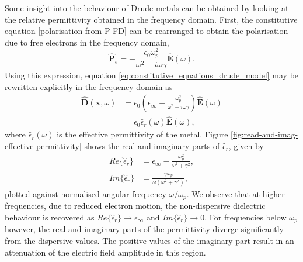 Some insight into the behaviour of Drude metals can be obtained by looking at the relative permittivity obtained in the frequency domain. First, the constitutive equation \ref{polarisation-from-P-FD} can be rearranged to obtain the polarisation due to free electrons in the frequency domain,
\begin{equation}
\hat{\mathbf{P}}_e = - \frac{\epsilon_0 \omega_p^2}{\omega^2 - i \omega \gamma } \hat{\mathbf{E}}(\omega) .
  \label{eq:polarization-field-freq-domain}
\end{equation}
Using this expression, equation \ref{eq:constitutive_equations_drude_model} may be rewritten explicitly in the frequency domain as
\begin{equation}
    \begin{split}
    \hat{\mathbf{D}}(\mathbf{x},\omega) &= \epsilon_0 \left( \epsilon_{\infty} - \frac{\omega_p^2 }{\omega^2 - i \omega \gamma } \right) \hat{\mathbf{E}}(\omega) \\
                                        &= \epsilon_0 \hat{\epsilon}_r (\omega) \hat{\mathbf{E}}(\omega) ,
    \end{split}
\end{equation}
where $\hat{\epsilon}_r(\omega)$ is the effective permittivity of the metal. Figure \ref{fig:read-and-imag-effective-permittivity} shows the real and imaginary parts of $\hat{\epsilon}_r$, given by
\begin{subequations}
\begin{align}
    Re\{ \hat{\epsilon}_r \} &= \epsilon_{\infty} - \frac{\omega_p^2}{\omega^2 + \gamma^2}, \\
    Im\{ \hat{\epsilon}_r \} &= \frac{\gamma \omega_p}{\omega ( \omega^2 + \gamma^2) } ,
\end{align}
\end{subequations}
plotted against normalised angular frequency $\omega / \omega_p$. We observe that at higher frequencies, due to reduced electron motion, the non-dispersive dielectric behaviour is recovered as $Re\{\hat{\epsilon}_r\} \to \epsilon_{\infty}$ and $Im\{\hat{\epsilon}_r\} \to 0$. For frequencies below $\omega_p$ however, the real and imaginary parts of the permittivity diverge significantly from the dispersive values. The positive values of the imaginary part result in an attenuation of the electric field amplitude in this region.

